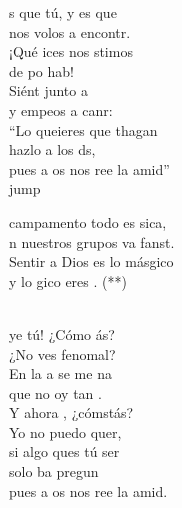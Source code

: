 \begin{cancion}%
	s que tú, y es que\\
	nos volos a encontr.\\
	¡Qué ices nos stimos\\
	de po hab!\\
	Siént junto a \\
	y empeos a canr:\\
	“Lo queieres que thagan\\
	hazlo  a los ds, \\
	pues a os nos ree la amid”\\jump\\
	\begin{chorus}%
	campamento todo es sica,\\
	n nuestros grupos va fanst.\\
	Sentir a Dios es lo másgico \\
	y lo gico eres . (**)  \\
	\end{chorus}%
	\jump\\
	ye tú! ¿Cómo ás?\\
	¿No ves fenomal?\\
	En la a se me na\\
	que no oy tan .\\
	Y ahora , ¿cómstás?\\
	Yo no puedo quer,\\
	si algo ques tú ser\\
	solo ba pregun\\
	pues a os nos ree la amid.\\
\end{cancion}%
